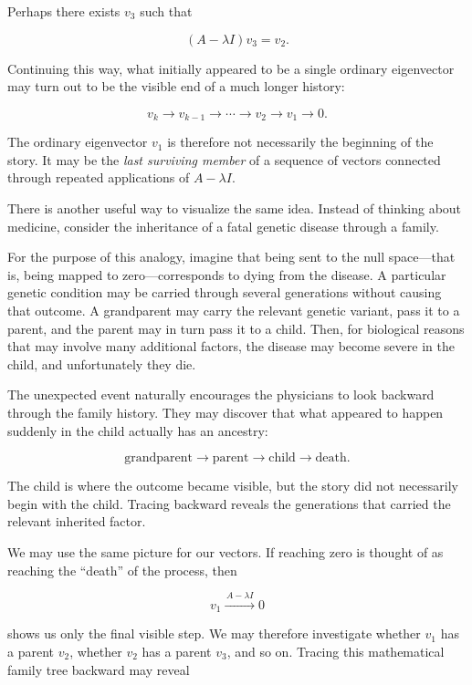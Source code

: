 \documentclass[11pt]{article}
\begin{document}
Perhaps there exists \(v_3\) such that

\[
(A-\lambda I)v_3=v_2.
\]

Continuing this way, what initially appeared to be a single ordinary
eigenvector may turn out to be the visible end of a much longer
history:

\[
\boxed{
v_k
\longrightarrow
v_{k-1}
\longrightarrow
\cdots
\longrightarrow
v_2
\longrightarrow
v_1
\longrightarrow
0.
}
\]

The ordinary eigenvector \(v_1\) is therefore not necessarily the
beginning of the story.  It may be the \emph{last surviving member} of
a sequence of vectors connected through repeated applications of
\(A-\lambda I\).

There is another useful way to visualize the same idea.  Instead of
thinking about medicine, consider the inheritance of a fatal genetic disease
through a family.

For the purpose of this analogy, imagine that being sent to the null
space---that is, being mapped to zero---corresponds to dying from the
disease.  A particular genetic condition may be carried through several
generations without causing that outcome.  A grandparent may carry the
relevant genetic variant, pass it to a parent, and the parent may in
turn pass it to a child.  Then, for biological reasons that may involve
many additional factors, the disease may become severe in the child, and unfortunately they die.

The unexpected event naturally encourages the physicians to look
backward through the family history.  They may discover that what
appeared to happen suddenly in the child actually has an ancestry:

\[
\boxed{
\text{grandparent}
\longrightarrow
\text{parent}
\longrightarrow
\text{child}
\longrightarrow
\text{death}.
}
\]

The child is where the outcome became visible, but the story did not
necessarily begin with the child.  Tracing backward reveals the
generations that carried the relevant inherited factor.

We may use the same picture for our vectors.  If reaching zero is
thought of as reaching the ``death'' of the process, then

\[
v_1
\xrightarrow{\,A-\lambda I\,}
0
\]

shows us only the final visible step.  We may therefore investigate
whether \(v_1\) has a parent \(v_2\), whether \(v_2\) has a parent
\(v_3\), and so on.  Tracing this mathematical family tree backward
may reveal
\end{document}
